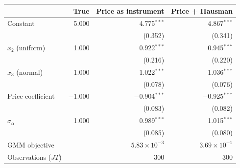 \begin{tabular}{lrrr}
\toprule
 & True & Price as instrument & Price + Hausman \\
\midrule
Constant & 5.000 & 4.775$^{***}$ & 4.867$^{***}$ \\
 &  & (0.352) & (0.341) \\
$x_2$ (uniform) & 1.000 & 0.922$^{***}$ & 0.945$^{***}$ \\
 &  & (0.216) & (0.220) \\
$x_3$ (normal) & 1.000 & 1.022$^{***}$ & 1.036$^{***}$ \\
 &  & (0.078) & (0.076) \\
Price coefficient & $-$1.000 & $-$0.904$^{***}$ & $-$0.925$^{***}$ \\
 &  & (0.083) & (0.082) \\
$\sigma_\alpha$ & 1.000 & 0.989$^{***}$ & 1.015$^{***}$ \\
 &  & (0.085) & (0.080) \\
\midrule
GMM objective &  & $5.83\times10^{-3}$ & $3.69\times10^{-1}$ \\
Observations ($JT$) &  & 300 & 300 \\
\bottomrule
\end{tabular}
